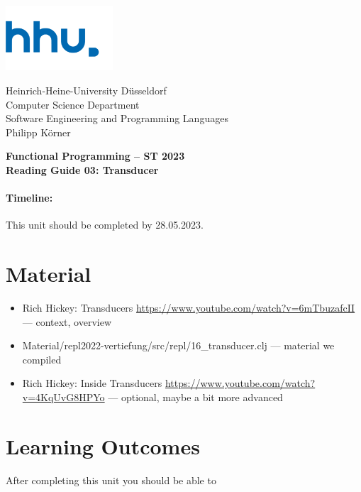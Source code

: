 \documentclass[11pt,a4paper]{article}
\begin{document}
\begin{minipage}[b]{\textwidth}
	\parbox[t]{5cm}{%
		\includegraphics[width=4cm]{unilogo}
		\hfill
	}
	\parbox[b]{11cm}{%
		Heinrich-Heine-University D\"usseldorf\\
		Computer Science Department\\
		Software Engineering and Programming Languages\\
		Philipp K\"orner %
	}
\end{minipage}
\begin{center}
	\bf
	Functional Programming -- ST 2023 \\
	Reading Guide 03: Transducer
\end{center}

\pagestyle{empty}

\paragraph{Timeline:} This unit should be completed by 28.05.2023.

\section{Material} 

\begin{itemize}
    \item Rich Hickey: Transducers \url{https://www.youtube.com/watch?v=6mTbuzafcII} --- context, overview
    \item Material/repl2022-vertiefung/src/repl/16\_transducer.clj --- material we compiled
    \item Rich Hickey: Inside Transducers \url{https://www.youtube.com/watch?v=4KqUvG8HPYo} --- optional, maybe a bit more advanced
\end{itemize}


\section{Learning Outcomes}

After completing this unit you should be able to
\end{document}
